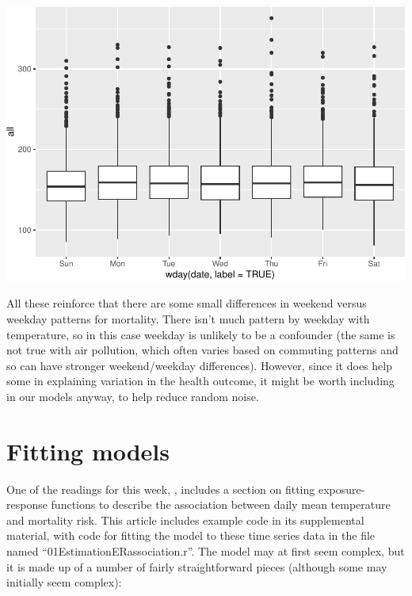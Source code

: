 \documentclass[
]{book}
\begin{document}
\includegraphics{adv_epi_analysis_files/figure-latex/unnamed-chunk-21-1.pdf}

All these reinforce that there are some small differences in weekend versus weekday
patterns for mortality. There isn't much pattern by weekday with temperature, so
in this case weekday is unlikely to be a confounder (the same is not true with
air pollution, which often varies based on commuting patterns and so can have
stronger weekend/weekday differences). However, since it does help some in explaining
variation in the health outcome, it might be worth including in our models anyway,
to help reduce random noise.

\hypertarget{fitting-models}{%
\section{Fitting models}\label{fitting-models}}

One of the readings for this week, \citet{vicedo2019hands}, includes a section
on fitting exposure-response functions to describe the association between
daily mean temperature and mortality risk. This article includes example
code in its supplemental material, with code for fitting the model to
these time series data in the file named ``01EstimationERassociation.r''.
The model may at first seem complex, but it is made up of a number of
fairly straightforward pieces (although some may initially seem complex):
\end{document}
